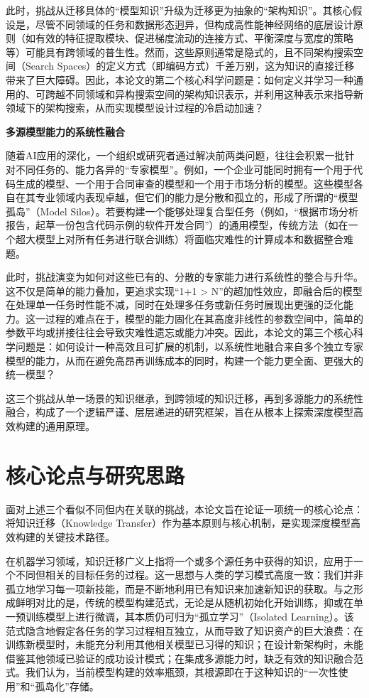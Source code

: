 \documentclass[../main.tex]{subfiles}
\begin{document}
此时，挑战从迁移具体的“模型知识”升级为迁移更为抽象的“架构知识”。其核心假设是，尽管不同领域的任务和数据形态迥异，但构成高性能神经网络的底层设计原则（如有效的特征提取模块、促进梯度流动的连接方式、平衡深度与宽度的策略等）可能具有跨领域的普生性。然而，这些原则通常是隐式的，且不同架构搜索空间（Search Spaces）的定义方式（即编码方式）千差万别，这为知识的直接迁移带来了巨大障碍。因此，本论文的第二个核心科学问题是：如何定义并学习一种通用的、可跨越不同领域和异构搜索空间的架构知识表示，并利用这种表示来指导新领域下的架构搜索，从而实现模型设计过程的冷启动加速？

\textbf{ 多源模型能力的系统性融合}

随着AI应用的深化，一个组织或研究者通过解决前两类问题，往往会积累一批针对不同任务的、能力各异的“专家模型”。例如，一个企业可能同时拥有一个用于代码生成的模型、一个用于合同审查的模型和一个用于市场分析的模型。这些模型各自在其专业领域内表现卓越，但它们的能力是分散和孤立的，形成了所谓的“模型孤岛”（Model Silos）。若要构建一个能够处理复合型任务（例如，“根据市场分析报告，起草一份包含代码示例的软件开发合同”）的通用模型，传统方法（如在一个超大模型上对所有任务进行联合训练）将面临灾难性的计算成本和数据整合难题。

此时，挑战演变为如何对这些已有的、分散的专家能力进行系统性的整合与升华。这不仅是简单的能力叠加，更追求实现“1+1 > N”的超加性效应，即融合后的模型在处理单一任务时性能不减，同时在处理多任务或新任务时展现出更强的泛化能力。这一过程的难点在于，模型的能力固化在其高度非线性的参数空间中，简单的参数平均或拼接往往会导致灾难性遗忘或能力冲突。因此，本论文的第三个核心科学问题是：如何设计一种高效且可扩展的机制，以系统性地融合来自多个独立专家模型的能力，从而在避免高昂再训练成本的同时，构建一个能力更全面、更强大的统一模型？

这三个挑战从单一场景的知识继承，到跨领域的知识迁移，再到多源能力的系统性融合，构成了一个逻辑严谨、层层递进的研究框架，旨在从根本上探索深度模型高效构建的通用原理。

\section[\hspace{-2pt}核心论点与研究思路]{{\heiti{} \hspace{-8pt}核心论点与研究思路}}\label{sec:core-idea}

面对上述三个看似不同但内在关联的挑战，本论文旨在论证一项统一的核心论点：将知识迁移（Knowledge Transfer）作为基本原则与核心机制，是实现深度模型高效构建的关键技术路径。

在机器学习领域，知识迁移广义上指将一个或多个源任务中获得的知识，应用于一个不同但相关的目标任务的过程。这一思想与人类的学习模式高度一致：我们并非孤立地学习每一项新技能，而是不断地利用已有知识来加速新知识的获取。与之形成鲜明对比的是，传统的模型构建范式，无论是从随机初始化开始训练，抑或在单一预训练模型上进行微调，其本质仍可归为“孤立学习”（Isolated Learning）。该范式隐含地假定各任务的学习过程相互独立，从而导致了知识资产的巨大浪费：在训练新模型时，未能充分利用其他相关模型已习得的知识；在设计新架构时，未能借鉴其他领域已验证的成功设计模式；在集成多源能力时，缺乏有效的知识融合范式。我们认为，当前模型构建的效率瓶颈，其根源即在于这种知识的“一次性使用”和“孤岛化”存储。
\end{document}
